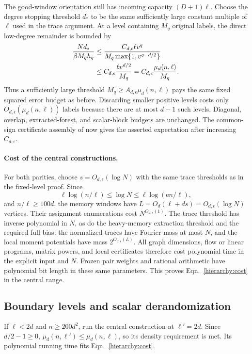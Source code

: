 \documentclass[letterpaper,11pt]{article}
\theoremstyle{definition}
\begin{document}
The good-window orientation still has incoming capacity $(D+1)\ell$.
Choose the degree stopping threshold $d_*$ to be the same sufficiently
large constant multiple of $\ell$ used in the trace argument.
At a level containing $M_q$ original labels, the direct low-degree
remainder is bounded by
\begin{align}
 \frac{Nd_*}{\beta M_qh_q}
 &\leq\frac{C_{d,\epsilon}\ell v^q}
                {M_q\max\{1,v^{q-d/2}\}}\notag\\
 &\leq C_{d,\epsilon}\frac{\ell v^{d/2}}{M_q}
  =C_{d,\epsilon}\frac{\mu_d(n,\ell)}{M_q}.
 \label{hierarchy:remainder}
\end{align}
Thus a sufficiently large threshold
$M_q\geq A_{d,\epsilon}\mu_d(n,\ell)$ pays the same fixed squared
error budget as before. Discarding smaller positive levels costs only
$O_{d,\epsilon}(\mu_d(n,\ell))$ labels because there are at most
$d-1$ such levels. Diagonal, overlap, extracted-forest, and scalar-block
budgets are unchanged. The common-sign certificate assembly of
 now gives the asserted expectation after increasing
$C_{d,\epsilon}$.

\paragraph{Cost of the central constructions.}
For both parities, choose $s=O_{d,\epsilon}(\log N)$ with the same
trace thresholds as in the fixed-level proof. Since
\[
 \ell\log(n/\ell)\leq\log N
 \leq\ell\log(\mathrm e n/\ell),
\]
and $n/\ell\geq100d$, the memory windows have
$L=O_d(\ell+ds)=O_{d,\epsilon}(\log N)$ vertices.
Their assignment enumerations cost $N^{O_{d,\epsilon}(1)}$.
The trace threshold has inverse polynomial in $N$, as do the
heavy-memory extraction threshold and the required full bias:
the normalized traces have Fourier mass at most $N$, and the local
moment potentials have mass $2^{O_{d,\epsilon}(L)}$.
All graph dimensions, flow or linear programs, matrix powers, and
local certificates therefore cost polynomial time in the explicit
input and $N$. Frozen pair weights and rational arithmetic have
polynomial bit length in these same parameters. This proves
Eqn.~\eqref{hierarchy:cost} in the central range.

\subsection{Boundary levels and scalar derandomization}

If $\ell<2d$ and $n\geq200d^2$, run the central construction at
$\ell'=2d$. Since $d/2-1\geq0$,
$\mu_d(n,\ell')\leq\mu_d(n,\ell)$, so its density requirement is
met. Its polynomial running time fits Eqn.~\eqref{hierarchy:cost}.
\end{document}
